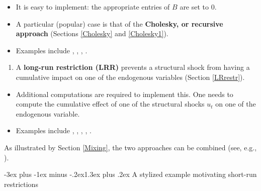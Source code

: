 \documentclass[
  11pt,
]{book}
\makeatletter
\providecommand{\tightlist}{%
  \setlength{\itemsep}{0pt}\setlength{\parskip}{0pt}}
\renewcommand\section{\@startsection{section}{1}{\z@}
  {-3ex plus -1ex minus -.2ex}{1.3ex plus .2ex}
  {\normalfont\Large\bfseries\color{TextbookInk}}}
\theoremstyle{definition}
\theoremstyle{definition}
\theoremstyle{definition}
\theoremstyle{definition}
\theoremstyle{remark}
\makeatother
\begin{document}
\begin{itemize}
\tightlist
\item
  It is easy to implement: the appropriate entries of \(B\) are set to 0.
\item
  A particular (popular) case is that of the \textbf{Cholesky, or recursive approach} (Sections \ref{Cholesky} and \ref{Cholesky1}).
\item
  Examples include \citet{BERNANKE198649}, \citet{Sims_1986}, \citet{Gali_1992}, \citet{RubioRamirez_et_al_2010}.
\end{itemize}

\begin{enumerate}
\def\labelenumi{\arabic{enumi}.}
\setcounter{enumi}{1}
\tightlist
\item
  A \textbf{long-run restriction (LRR)} prevents a structural shock from having a cumulative impact on one of the endogenous variables (Section \ref{LRrestr}).
\end{enumerate}

\begin{itemize}
\tightlist
\item
  Additional computations are required to implement this. One needs to compute the cumulative effect of one of the structural shocks \(u_{t}\) on one of the endogenous variable.
\item
  Examples include \citet{Blanchard_Quah_1989}, \citet{Faust_Leeper_1997}, \citet{Gali_1999}, \citet{Erceg_et_al_2005}, \citet{NBERc11177}.
\end{itemize}

As illustrated by Section \ref{Mixing}, the two approaches can be combined (see, e.g., \citet{Gerlach_Smets_1995}).

\section{A stylized example motivating short-run restrictions}\label{a-stylized-example-motivating-short-run-restrictions}
\end{document}
